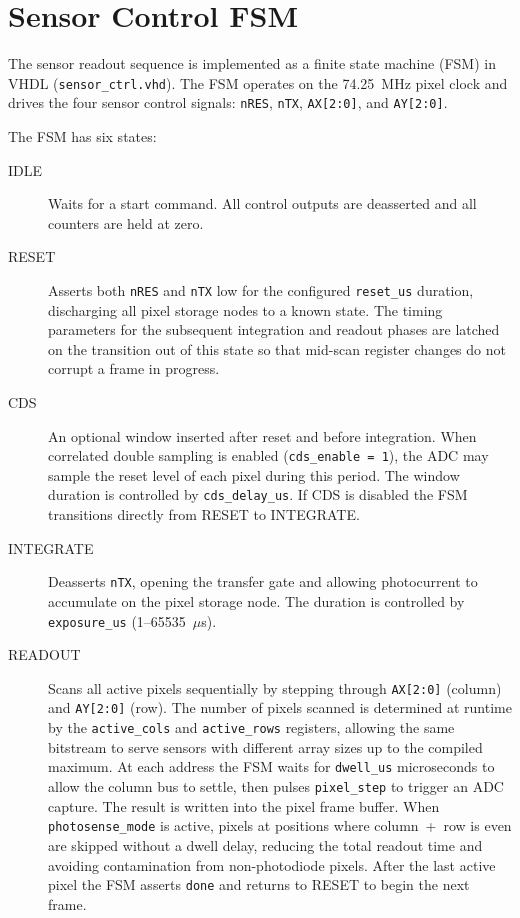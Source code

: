 
\section{Sensor Control FSM}

The sensor readout sequence is implemented as a finite state machine (FSM) in VHDL (\texttt{sensor\_ctrl.vhd}). The FSM operates on the 74.25~MHz pixel clock and drives the four sensor control signals: \texttt{nRES}, \texttt{nTX}, \texttt{AX[2:0]}, and \texttt{AY[2:0]}.

The FSM has six states:

\begin{description}
  \item[IDLE] Waits for a start command. All control outputs are deasserted and all counters are held at zero.

  \item[RESET] Asserts both \texttt{nRES} and \texttt{nTX} low for the configured \texttt{reset\_us} duration, discharging all pixel storage nodes to a known state. The timing parameters for the subsequent integration and readout phases are latched on the transition out of this state so that mid-scan register changes do not corrupt a frame in progress.

  \item[CDS] An optional window inserted after reset and before integration. When correlated double sampling is enabled (\texttt{cds\_enable = 1}), the ADC may sample the reset level of each pixel during this period. The window duration is controlled by \texttt{cds\_delay\_us}. If CDS is disabled the FSM transitions directly from RESET to INTEGRATE.

  \item[INTEGRATE] Deasserts \texttt{nTX}, opening the transfer gate and allowing photocurrent to accumulate on the pixel storage node. The duration is controlled by \texttt{exposure\_us} (1--65535~$\mu$s).

  \item[READOUT] Scans all active pixels sequentially by stepping through \texttt{AX[2:0]} (column) and \texttt{AY[2:0]} (row). The number of pixels scanned is determined at runtime by the \texttt{active\_cols} and \texttt{active\_rows} registers, allowing the same bitstream to serve sensors with different array sizes up to the compiled maximum. At each address the FSM waits for \texttt{dwell\_us} microseconds to allow the column bus to settle, then pulses \texttt{pixel\_step} to trigger an ADC capture. The result is written into the pixel frame buffer. When \texttt{photosense\_mode} is active, pixels at positions where column~+~row is even are skipped without a dwell delay, reducing the total readout time and avoiding contamination from non-photodiode pixels. After the last active pixel the FSM asserts \texttt{done} and returns to RESET to begin the next frame.


\end{description}
